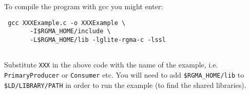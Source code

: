 To compile the program with gcc you might enter:

\begin{verbatim}
 gcc XXXExample.c -o XXXExample \
       -I$RGMA_HOME/include \
       -L$RGMA_HOME/lib -lglite-rgma-c -lssl
 
\end{verbatim}

Substitute \texttt{XXX} in the above code with the name of the example, i.e.
\texttt{PrimaryProducer} or \texttt{Consumer} etc. You will need to add
\verb!$RGMA_HOME!\texttt{/lib} to \verb!$LD!\texttt{/LIBRARY/PATH} in order to
run the example (to find the shared libraries).
